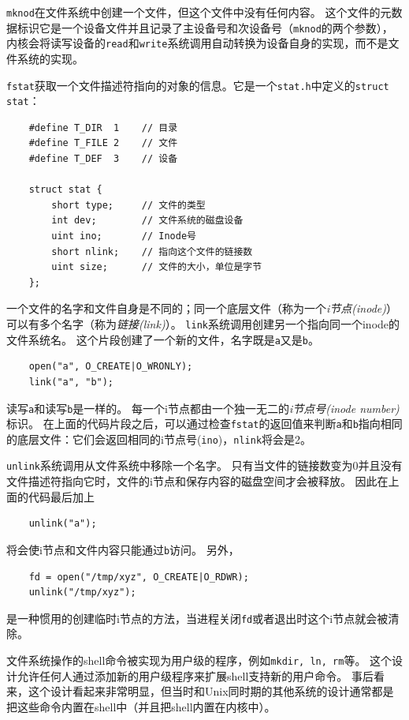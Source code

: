 \texttt{mknod}在文件系统中创建一个文件，但这个文件中没有任何内容。
这个文件的元数据标识它是一个设备文件并且记录了主设备号和次设备号（\texttt{mknod}的两个参数），内核会将读写设备的\texttt{read}和\texttt{write}系统调用自动转换为设备自身的实现，而不是文件系统的实现。

\texttt{fstat}获取一个文件描述符指向的对象的信息。它是一个\texttt{stat.h}中定义的\texttt{struct stat}：
\begin{lstlisting}
    #define T_DIR  1    // 目录
    #define T_FILE 2    // 文件
    #define T_DEF  3    // 设备

    struct stat {
        short type;     // 文件的类型
        int dev;        // 文件系统的磁盘设备
        uint ino;       // Inode号
        short nlink;    // 指向这个文件的链接数
        uint size;      // 文件的大小，单位是字节
    };
\end{lstlisting}

一个文件的名字和文件自身是不同的；同一个底层文件（称为一个\emph{i节点(inode)}）可以有多个名字（称为\emph{链接(link)}）。
\texttt{link}系统调用创建另一个指向同一个inode的文件系统名。
这个片段创建了一个新的文件，名字既是\texttt{a}又是\texttt{b}。

\begin{lstlisting}
    open("a", O_CREATE|O_WRONLY);
    link("a", "b");
\end{lstlisting}

读写\texttt{a}和读写\texttt{b}是一样的。
每一个i节点都由一个独一无二的\emph{i节点号(inode number)}标识。
在上面的代码片段之后，可以通过检查\texttt{fstat}的返回值来判断\texttt{a}和\texttt{b}指向相同的底层文件：它们会返回相同的i节点号(\texttt{ino})，\texttt{nlink}将会是2。

\texttt{unlink}系统调用从文件系统中移除一个名字。
只有当文件的链接数变为0并且没有文件描述符指向它时，文件的i节点和保存内容的磁盘空间才会被释放。
因此在上面的代码最后加上
\begin{lstlisting}
    unlink("a");
\end{lstlisting}
将会使i节点和文件内容只能通过\texttt{b}访问。
另外，
\begin{lstlisting}
    fd = open("/tmp/xyz", O_CREATE|O_RDWR);
    unlink("/tmp/xyz");
\end{lstlisting}
是一种惯用的创建临时i节点的方法，当进程关闭\texttt{fd}或者退出时这个i节点就会被清除。

文件系统操作的shell命令被实现为用户级的程序，例如\texttt{mkdir, ln, rm}等。
这个设计允许任何人通过添加新的用户级程序来扩展shell支持新的用户命令。
事后看来，这个设计看起来非常明显，但当时和Unix同时期的其他系统的设计通常都是把这些命令内置在shell中（并且把shell内置在内核中）。

